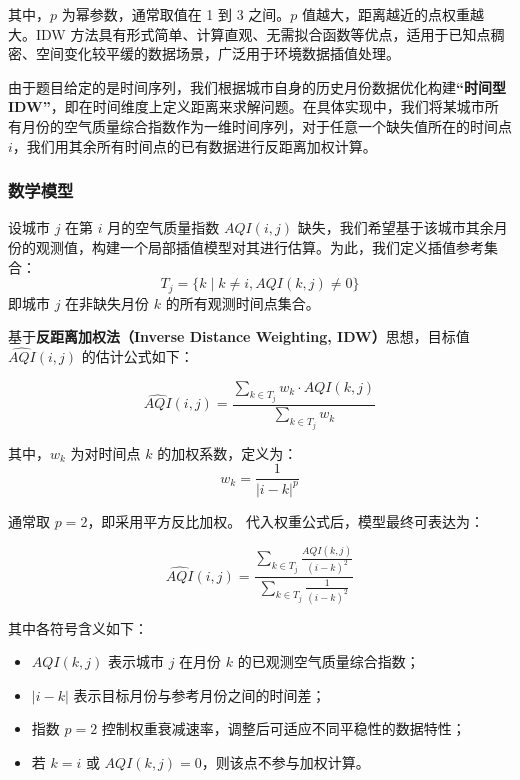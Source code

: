 \documentclass[a4paper,12pt]{article}
\begin{document}
	其中，$p$ 为幂参数，通常取值在 1 到 3 之间。$p$ 值越大，距离越近的点权重越大。IDW 方法具有形式简单、计算直观、无需拟合函数等优点，适用于已知点稠密、空间变化较平缓的数据场景，广泛用于环境数据插值处理。
	
	由于题目给定的是时间序列，我们根据城市自身的历史月份数据优化构建\textbf{“时间型 IDW”}，即在时间维度上定义距离来求解问题。在具体实现中，我们将某城市所有月份的空气质量综合指数作为一维时间序列，对于任意一个缺失值所在的时间点 $i$，我们用其余所有时间点的已有数据进行反距离加权计算。
	
	\subsubsection{数学模型}
	
	设城市 $j$ 在第 $i$ 月的空气质量指数 $AQI(i,j)$ 缺失，我们希望基于该城市其余月份的观测值，构建一个局部插值模型对其进行估算。为此，我们定义插值参考集合：
	\[
	T_j = \{k \mid k \neq i, AQI(k,j) \neq 0\}
	\]
	即城市 $j$ 在非缺失月份 $k$ 的所有观测时间点集合。
	
	基于\textbf{反距离加权法（Inverse Distance Weighting, IDW）}思想，目标值 $\hat{AQI}(i,j)$ 的估计公式如下：
	
	\begin{equation}
		\widehat{AQI}(i,j) = \frac{\displaystyle\sum_{k \in T_j} w_k \cdot AQI(k,j)}{\displaystyle\sum_{k \in T_j} w_k}
		\label{eq:idw_general}
	\end{equation}
	
	其中，$w_k$ 为对时间点 $k$ 的加权系数，定义为：
	\[
	w_k = \frac{1}{|i - k|^p}
	\]
	
	通常取 $p=2$，即采用平方反比加权。
	代入权重公式后，模型最终可表达为：
	
	\begin{equation}
		\widehat{AQI}(i,j) = \frac{\displaystyle\sum_{k \in T_j} \frac{AQI(k,j)}{(i - k)^2}}{\displaystyle\sum_{k \in T_j} \frac{1}{(i - k)^2}}
		\label{eq:time_idw_simple}
	\end{equation}
	
	其中各符号含义如下：
	
	\begin{itemize}
		\item $AQI(k,j)$ 表示城市 $j$ 在月份 $k$ 的已观测空气质量综合指数；
		\item $|i - k|$ 表示目标月份与参考月份之间的时间差；
		\item 指数 $p=2$ 控制权重衰减速率，调整后可适应不同平稳性的数据特性；
		\item 若 $k = i$ 或 $AQI(k,j)=0$，则该点不参与加权计算。
	\end{itemize}
	
\end{document}
